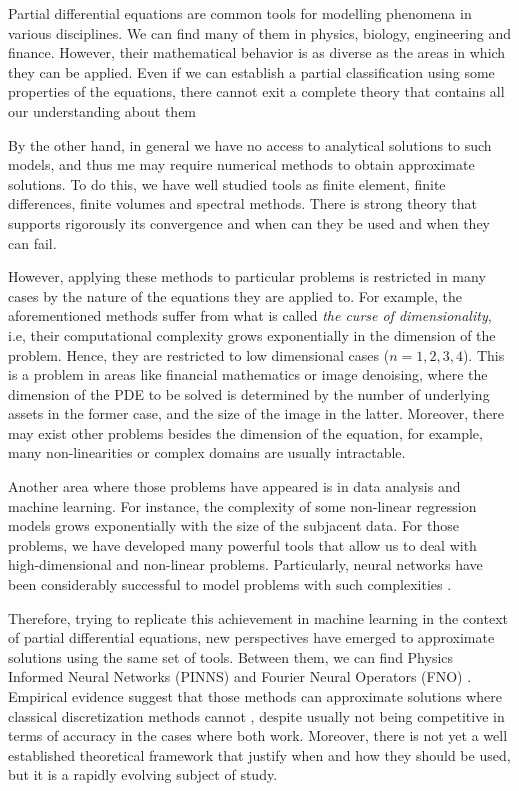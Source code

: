 Partial differential equations are common tools for modelling phenomena in various disciplines. We can find many of them in physics, biology, engineering and finance. However, their mathematical behavior is as diverse as the areas in which they can be applied. Even if we can establish a partial classification  using some properties of the equations, there cannot exit a complete theory that contains all our understanding about them

By the other hand, in general we have no access to analytical solutions to such models, and thus me may require numerical methods to obtain approximate solutions. To do this, we have well studied tools as finite element, finite differences, finite volumes and spectral methods. There is strong theory that supports rigorously its convergence and when can they be used and when they can fail.
 
However, applying these methods to particular problems is restricted in many cases by the nature of the equations they are applied to. For example, the aforementioned methods suffer from what is called \textit{the curse of dimensionality}, i.e, their computational complexity grows exponentially in the dimension of the problem. Hence, they are restricted to low dimensional cases ($n=1,2,3,4$). This is a problem in areas like financial mathematics or image denoising, where the dimension of the PDE to be solved is determined by the number of underlying assets in the former case, and the size of the image in the latter. Moreover, there may exist other problems besides the dimension of the equation, for example, many non-linearities or complex domains are usually intractable. 

Another area where those problems have appeared is in data analysis and machine learning. For instance, the complexity of some non-linear regression models grows exponentially with the size of the subjacent data. For those problems, we have developed many powerful tools that allow us to deal with high-dimensional and non-linear problems. Particularly, neural networks have been considerably successful to model problems with such complexities \cite{higham_deep_2019}. 

Therefore, trying to replicate this achievement in machine learning in the context of partial differential equations, new perspectives have emerged to approximate solutions using the same set of tools. Between them, we can find Physics Informed Neural Networks (PINNS) \cite{raissi_physics-informed_2019,sirignano_dgm_2018} and Fourier Neural Operators (FNO) \cite{li_fourier_2021}. Empirical evidence suggest that those methods can approximate solutions where classical discretization methods cannot \cite{cuomo_scientific_2022,blechschmidt_three_2021}, despite usually not being competitive in terms of accuracy in the cases where both work. Moreover, there is not yet a well established theoretical framework that justify when and how they should be used, but it is a rapidly evolving subject of study.

